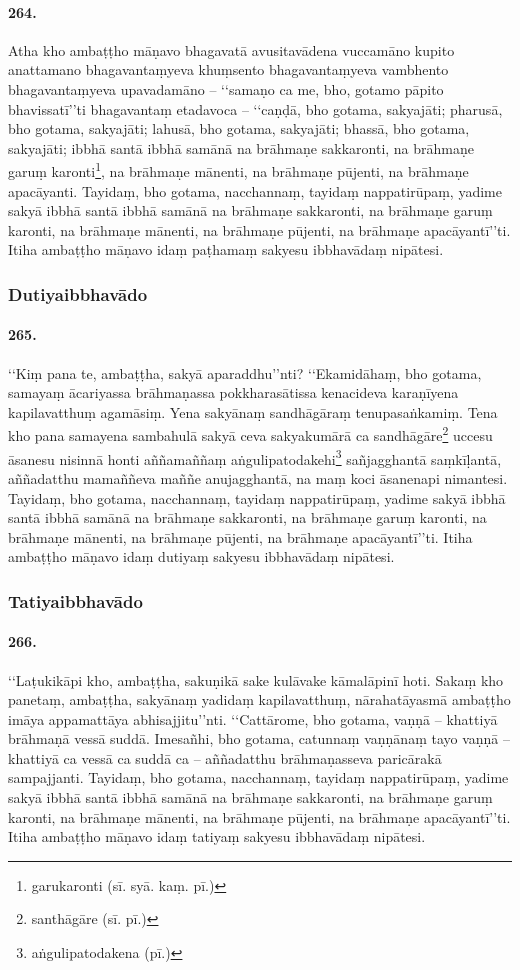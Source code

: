 \paragraph{264.} Atha kho ambaṭṭho māṇavo bhagavatā avusitavādena vuccamāno kupito anattamano bhagavantaṃyeva khuṃsento bhagavantaṃyeva vambhento bhagavantaṃyeva upavadamāno – ‘‘samaṇo ca me, bho, gotamo pāpito bhavissatī’’ti bhagavantaṃ etadavoca – ‘‘caṇḍā, bho gotama, sakyajāti; pharusā, bho gotama, sakyajāti; lahusā, bho gotama, sakyajāti; bhassā, bho gotama, sakyajāti; ibbhā santā ibbhā samānā na brāhmaṇe sakkaronti, na brāhmaṇe garuṃ karonti\footnote{garukaronti (sī. syā. kaṃ. pī.)}, na brāhmaṇe mānenti, na brāhmaṇe pūjenti, na brāhmaṇe apacāyanti. Tayidaṃ, bho gotama, nacchannaṃ, tayidaṃ nappatirūpaṃ, yadime sakyā ibbhā santā ibbhā samānā na brāhmaṇe sakkaronti, na brāhmaṇe garuṃ karonti, na brāhmaṇe mānenti, na brāhmaṇe pūjenti, na brāhmaṇe apacāyantī’’ti. Itiha ambaṭṭho māṇavo idaṃ paṭhamaṃ sakyesu ibbhavādaṃ nipātesi.

\subsubsection{Dutiyaibbhavādo}

\paragraph{265.} ‘‘Kiṃ pana te, ambaṭṭha, sakyā aparaddhu’’nti? ‘‘Ekamidāhaṃ, bho gotama, samayaṃ ācariyassa brāhmaṇassa pokkharasātissa kenacideva karaṇīyena kapilavatthuṃ agamāsiṃ. Yena sakyānaṃ sandhāgāraṃ tenupasaṅkamiṃ. Tena kho pana samayena sambahulā sakyā ceva sakyakumārā ca sandhāgāre\footnote{santhāgāre (sī. pī.)} uccesu āsanesu nisinnā honti aññamaññaṃ aṅgulipatodakehi\footnote{aṅgulipatodakena (pī.)} sañjagghantā saṃkīḷantā, aññadatthu mamaññeva maññe anujagghantā, na maṃ koci āsanenapi nimantesi. Tayidaṃ, bho gotama, nacchannaṃ, tayidaṃ nappatirūpaṃ, yadime sakyā ibbhā santā ibbhā samānā na brāhmaṇe sakkaronti, na brāhmaṇe garuṃ karonti, na brāhmaṇe mānenti, na brāhmaṇe pūjenti, na brāhmaṇe apacāyantī’’ti. Itiha ambaṭṭho māṇavo idaṃ dutiyaṃ sakyesu ibbhavādaṃ nipātesi.

\subsubsection{Tatiyaibbhavādo}

\paragraph{266.} ‘‘Laṭukikāpi kho, ambaṭṭha, sakuṇikā sake kulāvake kāmalāpinī hoti. Sakaṃ kho panetaṃ, ambaṭṭha, sakyānaṃ yadidaṃ kapilavatthuṃ, nārahatāyasmā ambaṭṭho imāya appamattāya abhisajjitu’’nti. ‘‘Cattārome, bho gotama, vaṇṇā – khattiyā brāhmaṇā vessā suddā. Imesañhi, bho gotama, catunnaṃ vaṇṇānaṃ tayo vaṇṇā – khattiyā ca vessā ca suddā ca – aññadatthu brāhmaṇasseva paricārakā sampajjanti. Tayidaṃ, bho gotama, nacchannaṃ, tayidaṃ nappatirūpaṃ, yadime sakyā ibbhā santā ibbhā samānā na brāhmaṇe sakkaronti, na brāhmaṇe garuṃ karonti, na brāhmaṇe mānenti, na brāhmaṇe pūjenti, na brāhmaṇe apacāyantī’’ti. Itiha ambaṭṭho māṇavo idaṃ tatiyaṃ sakyesu ibbhavādaṃ nipātesi.

